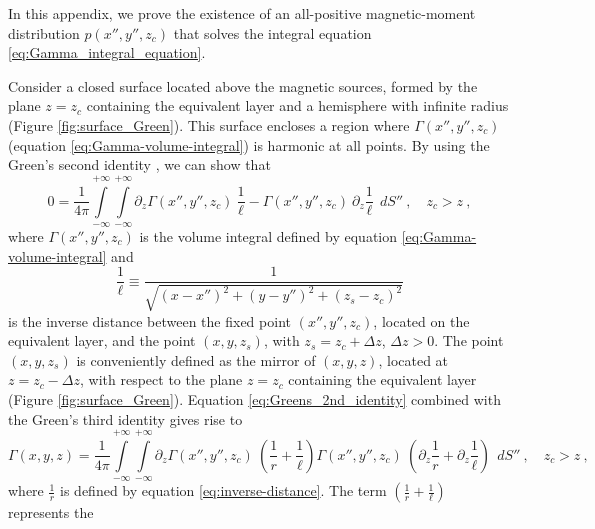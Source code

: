 \label{append:proof-positive-p}

In this appendix, we prove the existence of an all-positive magnetic-moment 
distribution $p(x'', y'', z_{c})$ that solves the integral equation 
\ref{eq:Gamma_integral_equation}.

Consider a closed surface located above the magnetic sources, formed by the plane $z = z_{c}$ containing the equivalent layer and a hemisphere with infinite radius
(Figure \ref{fig:surface_Green}).
This surface encloses a region where $\Gamma(x'', y'', z_{c})$ 
(equation \ref{eq:Gamma-volume-integral}) is harmonic at all points.
By using the Green's second identity \citep[][ p. 215]{kellogg1967}, we can show that
\begin{equation}
0 = \frac{1}{4\pi}
\int\limits_{-\infty}^{+\infty}\int\limits_{-\infty}^{+\infty}
\partial_{z} \Gamma(x'', y'', z_{c}) \: \frac{1}{\ell} - 
\Gamma(x'', y'', z_{c}) \: \partial_{z} \frac{1}{\ell}
\:\: dS'' \: , \quad z_{c} > z \: ,
\label{eq:Greens_2nd_identity}
\end{equation}
where $\Gamma(x'', y'', z_{c})$ is the volume integral defined by equation 
\ref{eq:Gamma-volume-integral} and
\begin{equation}
\frac{1}{\ell} \equiv \frac{1}{\sqrt{(x - x'')^{2} +
		(y - y'')^{2} +
		(z_{s} - z_{c})^{2}}}
\label{eq:inv-l}
\end{equation}
is the inverse distance between the fixed point $(x'', y'', z_{c})$, located on the
equivalent layer, and the point $(x, y, z_{s})$, with $z_{s} = z_{c} + \Delta z$,
$\Delta z > 0$.
The point $(x, y, z_{s})$ is conveniently defined as the mirror of $(x, y, z)$,
located at $z = z_{c} - \Delta z$, with respect to the plane $z = z_{c}$ containing
the equivalent layer (Figure \ref{fig:surface_Green}).
Equation \ref{eq:Greens_2nd_identity} combined with the 
Green's third identity \citep[][ p. 219]{kellogg1967} gives rise to
\begin{equation}
\Gamma(x, y, z) = \frac{1}{4\pi}
\int\limits_{-\infty}^{+\infty}\int\limits_{-\infty}^{+\infty}
\partial_{z} \Gamma(x'', y'', z_{c}) \: 
\left( \frac{1}{r} + \frac{1}{\ell} \right)
\Gamma(x'', y'', z_{c}) \: 
\left( \partial_{z} \frac{1}{r} + \partial_{z} \frac{1}{\ell} \right)
\:\: dS'' \: , \quad z_{c} > z \: ,
\label{eq:Greens_3rd_identity}
\end{equation}
where $\frac{1}{r}$ is defined by equation \ref{eq:inverse-distance}.
The term $\left( \frac{1}{r} + \frac{1}{\ell} \right)$ represents the 
